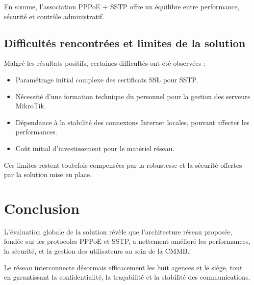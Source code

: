 En somme, l’association \gls{PPPoE} + \gls{SSTP} offre un équilibre entre performance, sécurité et contrôle administratif.





\subsection{Difficultés rencontrées et limites de la solution}

Malgré les résultats positifs, certaines difficultés ont été observées :  

\begin{itemize}
    \item Paramétrage initial complexe des certificats \gls{SSL} pour \gls{SSTP}.
    \item Nécessité d’une formation technique du personnel pour la gestion des serveurs MikroTik.
    \item Dépendance à la stabilité des connexions Internet locales, pouvant affecter les performances.
    \item Coût initial d’investissement pour le matériel réseau.
\end{itemize}

Ces limites restent toutefois compensées par la robustesse et la sécurité offertes par la solution mise en place.




{}
\section*{Conclusion}
L’évaluation globale de la solution révèle que l’architecture réseau proposée, fondée 
sur les protocoles \gls{PPPoE} et \gls{SSTP}, a nettement amélioré les performances, la 
sécurité, et la gestion des utilisateurs au sein de la \gls{CMMB}. 

Le réseau interconnecte désormais efficacement les huit agences et le siège, tout en 
garantissant la confidentialité, la traçabilité et la stabilité des communications.
